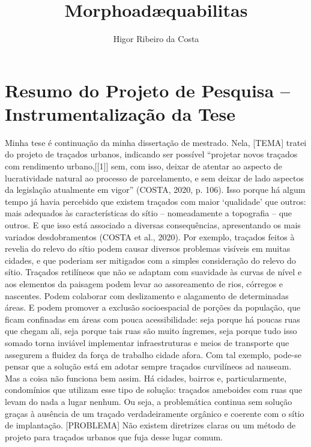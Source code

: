 \documentclass[]{report}
\title{Morphoadæquabilitas}
\author{Higor Ribeiro da Costa}
\begin{document}
\maketitle

\tableofcontents

\begin{abstract}
\end{abstract}

\setcounter{secnumdepth}{0}
\chapter{Resumo do Projeto de Pesquisa – Instrumentalização da Tese}

	Minha tese é continuação da minha dissertação de mestrado. Nela, [TEMA] tratei do projeto de traçados urbanos, indicando ser possível “projetar novos traçados com rendimento urbano,[[1]] sem, com isso, deixar de atentar ao aspecto de lucratividade natural ao processo de parcelamento, e sem deixar de lado aspectos da legislação atualmente em vigor” (COSTA, 2020, p. 106). Isso porque há algum tempo já havia percebido que existem traçados com maior ‘qualidade’ que outros: mais adequados às características do sítio – nomeadamente a topografia – que outros. E que isso está associado a diversas consequências, apresentando os mais variados desdobramentos (COSTA et al., 2020). Por exemplo, traçados feitos à revelia do relevo do sítio podem causar diversos problemas visíveis em muitas cidades, e que poderiam ser mitigados com a simples consideração do relevo do sítio. Traçados retilíneos que não se adaptam com suavidade às curvas de nível e aos elementos da paisagem podem levar ao assoreamento de rios, córregos e nascentes. Podem colaborar com deslizamento e alagamento de determinadas áreas. E podem promover a exclusão socioespacial de porções da população, que ficam confinadas em áreas com pouca acessibilidade: seja porque há poucas ruas que chegam ali, seja porque tais ruas são muito íngremes, seja porque tudo isso somado torna inviável implementar infraestruturas e meios de transporte que assegurem a fluidez da força de trabalho cidade afora. Com tal exemplo, pode-se pensar que a solução está em adotar sempre traçados curvilíneos ad nauseam. Mas a coisa não funciona bem assim. Há cidades, bairros e, particularmente, condomínios que utilizam esse tipo de solução: traçados ameboides com ruas que levam do nada a lugar nenhum. Ou seja, a problemática continua sem solução graças à ausência de um traçado verdadeiramente orgânico e coerente com o sítio de implantação. [PROBLEMA] Não existem diretrizes claras ou um método de projeto para traçados urbanos que fuja desse lugar comum.
\end{document}
